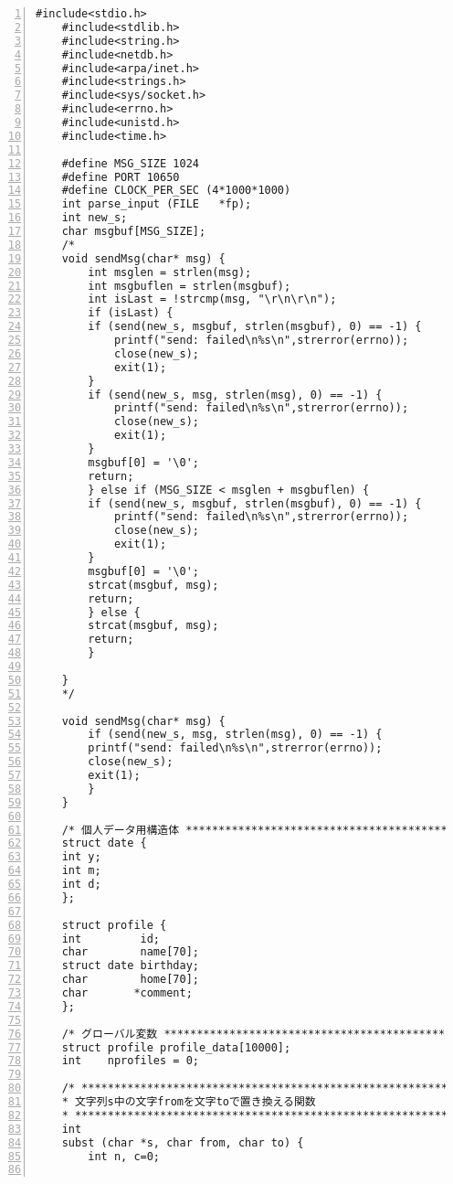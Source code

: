 \documentclass[11pt]{jarticle}
\begin{document}
\begin{lstlisting}[caption=サーバ側プログラム,label=server,numbers=left]
    #include<stdio.h>
    #include<stdlib.h>
    #include<string.h>
    #include<netdb.h>
    #include<arpa/inet.h>
    #include<strings.h>
    #include<sys/socket.h>
    #include<errno.h>
    #include<unistd.h>
    #include<time.h>

    #define MSG_SIZE 1024
    #define PORT 10650
    #define CLOCK_PER_SEC (4*1000*1000)
    int parse_input (FILE	*fp);
    int new_s;
    char msgbuf[MSG_SIZE];
    /*
    void sendMsg(char* msg) {
        int msglen = strlen(msg);
        int msgbuflen = strlen(msgbuf);
        int isLast = !strcmp(msg, "\r\n\r\n");
        if (isLast) {
        if (send(new_s, msgbuf, strlen(msgbuf), 0) == -1) {
            printf("send: failed\n%s\n",strerror(errno));
            close(new_s);
            exit(1);
        }
        if (send(new_s, msg, strlen(msg), 0) == -1) {
            printf("send: failed\n%s\n",strerror(errno));
            close(new_s);
            exit(1);
        }
        msgbuf[0] = '\0';
        return;
        } else if (MSG_SIZE < msglen + msgbuflen) {
        if (send(new_s, msgbuf, strlen(msgbuf), 0) == -1) {
            printf("send: failed\n%s\n",strerror(errno));
            close(new_s);
            exit(1);
        }
        msgbuf[0] = '\0';
        strcat(msgbuf, msg);
        return;
        } else {
        strcat(msgbuf, msg);
        return;
        }
        
    } 
    */

    void sendMsg(char* msg) {
        if (send(new_s, msg, strlen(msg), 0) == -1) {
        printf("send: failed\n%s\n",strerror(errno));
        close(new_s);
        exit(1);
        }
    }

    /* 個人データ用構造体 ******************************************** */
    struct date {
    int y;
    int m;
    int d;
    };

    struct profile {
    int         id;
    char        name[70];
    struct date birthday;
    char        home[70];
    char       *comment;
    };

    /* グローバル変数 ************************************************ */
    struct profile profile_data[10000];
    int    nprofiles = 0;

    /* ************************************************************** *
    * 文字列s中の文字fromを文字toで置き換える関数
    * *************************************************************** */
    int
    subst (char *s, char from, char to) {
        int n, c=0;


\end{lstlisting}
\end{document}
